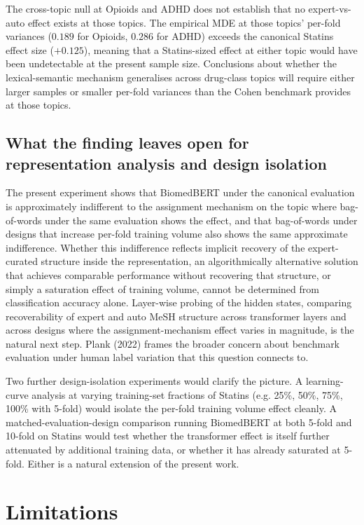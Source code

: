 \documentclass[11pt,a4paper]{article}
\begin{document}
The cross-topic null at Opioids and ADHD does not establish that no expert-vs-auto effect exists at those topics. The empirical MDE at those topics' per-fold variances ($0.189$ for Opioids, $0.286$ for ADHD) exceeds the canonical Statins effect size ($+0.125$), meaning that a Statins-sized effect at either topic would have been undetectable at the present sample size. Conclusions about whether the lexical-semantic mechanism generalises across drug-class topics will require either larger samples or smaller per-fold variances than the Cohen benchmark provides at those topics.

\subsection{What the finding leaves open for representation analysis and design isolation}

The present experiment shows that BiomedBERT under the canonical evaluation is approximately indifferent to the assignment mechanism on the topic where bag-of-words under the same evaluation shows the effect, and that bag-of-words under designs that increase per-fold training volume also shows the same approximate indifference. Whether this indifference reflects implicit recovery of the expert-curated structure inside the representation, an algorithmically alternative solution that achieves comparable performance without recovering that structure, or simply a saturation effect of training volume, cannot be determined from classification accuracy alone. Layer-wise probing of the hidden states, comparing recoverability of expert and auto MeSH structure across transformer layers and across designs where the assignment-mechanism effect varies in magnitude, is the natural next step. Plank (2022) frames the broader concern about benchmark evaluation under human label variation that this question connects to.

Two further design-isolation experiments would clarify the picture. A learning-curve analysis at varying training-set fractions of Statins (e.g. 25\%, 50\%, 75\%, 100\% with 5-fold) would isolate the per-fold training volume effect cleanly. A matched-evaluation-design comparison running BiomedBERT at both 5-fold and 10-fold on Statins would test whether the transformer effect is itself further attenuated by additional training data, or whether it has already saturated at 5-fold. Either is a natural extension of the present work.

\section{Limitations}
\end{document}
